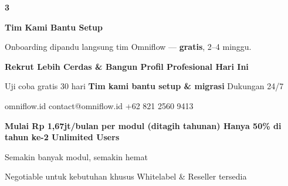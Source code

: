 \documentclass[a4paper]{article}
\begin{document}
\begin{center}
\begin{minipage}[t]{0.318\textwidth}
{\begin{minipage}[t][4.7cm][c]{\dimexpr\linewidth-2\fboxsep\relax}
            \begin{center}
                {\fontsize{22}{26}\selectfont\bfseries\color{BluePrimary} 3}
            \end{center}
            \vspace{2pt}
            \begin{center}
                {\fontsize{10}{13}\selectfont\bfseries\color{BlueDark} Tim Kami Bantu Setup}\par\vspace{3pt}
                {\fontsize{9}{12}\selectfont\color{TextDark} Onboarding dipandu langsung tim Omniflow --- \textbf{gratis}, 2--4 minggu.}
            \end{center}
        \end{minipage}}
\end{minipage}
\end{center}

\vspace{8pt}

{\setlength{\fboxsep}{10pt}\setlength{\fboxrule}{0pt}%
\noindent\colorbox{BluePrimary}{%
    \begin{minipage}{\dimexpr\textwidth-2\fboxsep\relax}
        \centering
        {\fontsize{13}{16}\selectfont\bfseries\color{White}
        Rekrut Lebih Cerdas \& Bangun Profil Profesional Hari Ini}\par\vspace{3pt}
        {\fontsize{9.5}{12}\selectfont\color{BlueMid}
        Uji coba gratis 30 hari \enspace\textbullet\enspace \textbf{Tim kami bantu setup \& migrasi} \enspace\textbullet\enspace Dukungan 24/7}\par\vspace{2pt}
        {\fontsize{9.5}{12}\selectfont\color{BlueLight}
        omniflow.id \enspace\textbullet\enspace contact@omniflow.id \enspace\textbullet\enspace +62 821 2560 9413}
    \end{minipage}}}


\vspace{6pt}

{\setlength{\fboxsep}{8pt}\setlength{\fboxrule}{0pt}%
\noindent\colorbox{BlueBg}{%
    \begin{minipage}{\dimexpr\textwidth-2\fboxsep\relax}
        \centering
        {\fontsize{9}{12}\selectfont\bfseries\color{BluePrimary}
        Mulai Rp 1,67jt/bulan per modul (ditagih tahunan) \enspace\textbullet\enspace Hanya 50\% di tahun ke-2 \enspace\textbullet\enspace Unlimited Users}\par\vspace{1pt}
        {\fontsize{8.5}{11}\selectfont\color{BlueDark}
        Semakin banyak modul, semakin hemat}\par\vspace{1pt}
        {\fontsize{8}{10}\selectfont\color{TextLight}
        Negotiable untuk kebutuhan khusus \enspace\textbullet\enspace Whitelabel \& Reseller tersedia}
    \end{minipage}}}

\restoregeometry
\pagestyle{empty}
\end{document}

